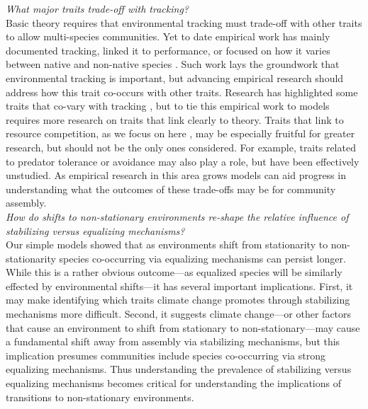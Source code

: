\documentclass[11pt,letterpaper]{article}
\begin{document}
\emph{What major traits trade-off with tracking?} \\

Basic theory requires that environmental tracking must trade-off with other traits to allow multi-species communities. Yet to date empirical work has mainly documented tracking, linked it to performance, or focused on how it varies between native and non-native species \citep{Willis:2010al,wolkovichAmBot2013,Zettlemoyer2019}. Such work lays the groundwork that environmental tracking is important, but advancing empirical research should address how this trait co-occurs with other traits. Research has highlighted some traits that co-vary with tracking \citep[e.g.,][]{kharouba2014,lasky2016,Zhu2016BioLetters}, but to tie this empirical work to models requires more research on traits that link clearly to theory. Traits that link to resource competition, as we focus on here \citep[as others have as well, see][]{volkerass}, may be especially fruitful for greater research, but should not be the only ones considered. For example, traits related to predator tolerance or avoidance may also play a role, but have been effectively unstudied.  As empirical research in this area grows models can aid progress in understanding what the outcomes of these trade-offs may be for community assembly.\\ 

\emph{How do shifts to non-stationary environments re-shape the relative influence of stabilizing versus equalizing mechanisms?} \\

Our simple models showed that as environments shift from stationarity to non-stationarity species co-occurring via equalizing mechanisms can persist longer. While this is a rather obvious outcome---as equalized species will be similarly effected by environmental shifts---it has several important implications. First, it may make identifying which traits climate change promotes through stabilizing mechanisms more difficult. Second, it suggests climate change---or other factors that cause an environment to shift from stationary to non-stationary---may cause a fundamental shift away from assembly via stabilizing mechanisms, but this implication presumes communities include species co-occurring via strong equalizing mechanisms. Thus understanding the prevalence of stabilizing versus equalizing mechanisms \citep[which ecology has worked on for many decades,][]{Caswell:1976np,Gravel:2006ax,Chesson:2000vd} becomes critical for understanding the implications of transitions to non-stationary environments. 
\end{document}
